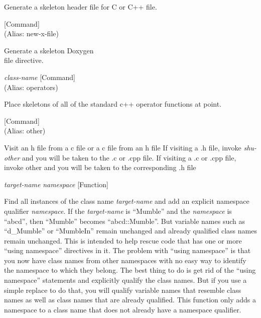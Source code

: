 \begin{doc-string}
Generate a skeleton header file for C or C++ file.
\end{doc-string}

\vspace{1em}
\noindent
{}
\usebox{\funcname}
 \hfill [Command]\\%
 (Alias: new-x-file)

\begin{doc-string}
Generate a skeleton Doxygen \\file directive.
\end{doc-string}

\vspace{1em}
\noindent
{}
\usebox{\funcname}\emph{class-name}
 \hfill [Command]\\%
 (Alias: operators)

\begin{doc-string}
Place skeletons of all of the standard c++ operator functions at point.
\end{doc-string}

\vspace{1em}
\noindent
{}
\usebox{\funcname}
 \hfill [Command]\\%
 (Alias: other)

\begin{doc-string}
Visit an h file from a c file or a c file from an h file
If visiting a .h file, invoke \emph{shu-other} and you will be taken to the
.c or .cpp file.  If visiting a .c or .cpp file, invoke other and you
will be taken to the corresponding .h file
\end{doc-string}

\vspace{1em}
\noindent
{}
\usebox{\funcname}\emph{target-name} \emph{namespace}
 \hfill [Function]

\begin{doc-string}
Find all instances of the class name \emph{target-name} and add an explicit namespace
qualifier \emph{namespace}.  If the \emph{target-name} is ``Mumble'' and the \emph{namespace} is
``abcd'', then ``Mumble'' becomes ``abcd::Mumble''.  But variable names such
as ``d\_Mumble'' or ``MumbleIn'' remain unchanged and already qualified class
names remain unchanged.
This is intended to help rescue code that has one or more ``using namespace''
directives in it.  The problem with ``using namespace'' is that you now have
class names from other namespaces with no easy way to identify the namespace
to which they belong.  The best thing to do is get rid of the ``using
namespace'' statements and explicitly qualify the class names.  But if you
use a simple replace to do that, you will qualify variable names that resemble
class names as well as class names that are already qualified.  This function
only adds a namespace to a class name that does not already have a namespace
qualifier.
\end{doc-string}

